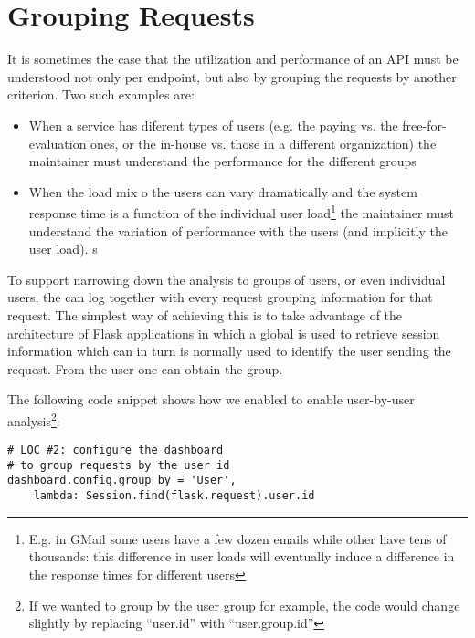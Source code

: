 
\section{Grouping Requests}
\label{sec:user}

It is sometimes the case that the utilization and performance of an API must be understood not only per endpoint, but also by grouping the requests by another criterion. Two such examples are: 
\begin{itemize}
	\item When a service has diferent types of users (e.g. the paying vs. the free-for-evaluation ones, or the in-house vs. those in a different organization) the maintainer must understand the performance for the different groups
	\item When the load mix o the users can vary dramatically and the system response time is a function of the individual user load\footnote{E.g. in GMail some users have a few dozen emails while other have tens of thousands: this difference in user loads will eventually induce a difference in the response times for different users} the maintainer must understand the variation of performance with the users (and implicitly the user load). s
\end{itemize}

To support narrowing down the analysis to groups of users, or even individual users, the \tool can log together with every request grouping information for that request. The simplest way of achieving this is to take advantage of the architecture of Flask applications in which a global  is used to retrieve session information which can in turn is normally used to identify the user sending the request. From the user one can obtain the group. 

\niceseparator

The following code snippet shows how we enabled \tool to enable user-by-user analysis\footnote{If we wanted to group by the user group for example, the code would change slightly by replacing ``user.id'' with ``user.group.id''}: 

\begin{lstlisting}[style=custompython]  
# LOC #2: configure the dashboard
# to group requests by the user id
dashboard.config.group_by = 'User',
	lambda: Session.find(flask.request).user.id

\end{lstlisting}

